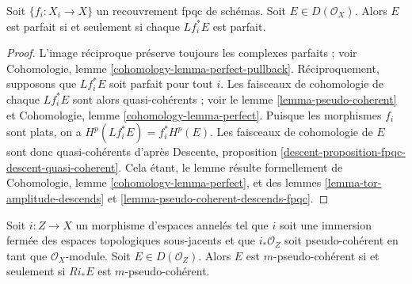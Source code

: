 \begin{lemma}
\label{lemma-perfect-descends-fpqc}
Soit $\{f_i : X_i \to X\}$ un recouvrement fpqc de schémas. Soit
$E \in D(\mathcal{O}_X)$. Alors $E$ est parfait
si et seulement si chaque $Lf_i^*E$ est parfait.
\end{lemma}

\begin{proof}
L'image réciproque préserve toujours les complexes parfaits ; voir
Cohomologie, lemme \ref{cohomology-lemma-perfect-pullback}.
Réciproquement, supposons que $Lf_i^*E$ soit parfait pour tout $i$.
Les faisceaux de cohomologie de chaque $Lf_i^*E$ sont alors quasi-cohérents ; voir
le lemme \ref{lemma-pseudo-coherent}
et
Cohomologie, lemme \ref{cohomology-lemma-perfect}.
Puisque les morphismes $f_i$ sont plats, on a $H^p(Lf_i^*E) = f_i^*H^p(E)$.
Les faisceaux de cohomologie de $E$ sont donc quasi-cohérents d'après
Descente, proposition \ref{descent-proposition-fpqc-descent-quasi-coherent}.
Cela étant, le lemme résulte formellement de
Cohomologie, lemme \ref{cohomology-lemma-perfect},
et des
lemmes \ref{lemma-tor-amplitude-descends} et
\ref{lemma-pseudo-coherent-descends-fpqc}.
\end{proof}

\begin{lemma}
\label{lemma-closed-push-pseudo-coherent}
Soit $i : Z \to X$ un morphisme d'espaces annelés tel que
$i$ soit une immersion fermée des espaces topologiques sous-jacents et que
$i_*\mathcal{O}_Z$ soit pseudo-cohérent en tant que $\mathcal{O}_X$-module.
Soit $E \in D(\mathcal{O}_Z)$. Alors $E$ est $m$-pseudo-cohérent
si et seulement si $Ri_*E$ est $m$-pseudo-cohérent.
\end{lemma}

